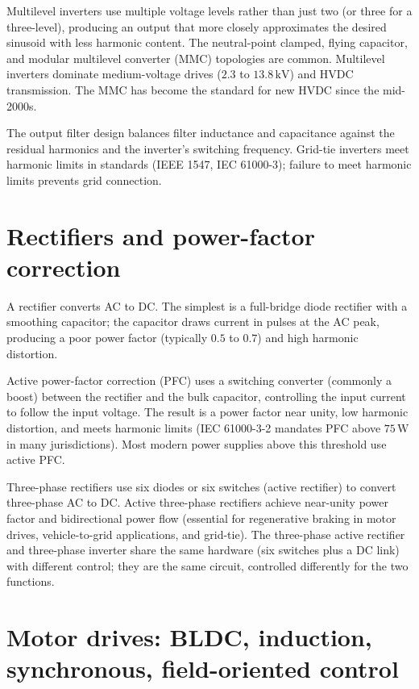 Multilevel inverters use multiple voltage levels rather than just two (or three for a three-level), producing an output that more closely approximates the desired sinusoid with less harmonic content. The neutral-point clamped, flying capacitor, and modular multilevel converter (MMC) topologies are common. Multilevel inverters dominate medium-voltage drives ($2.3$ to $13.8\,\text{kV}$) and HVDC transmission. The MMC has become the standard for new HVDC since the mid-2000s.

The output filter design balances filter inductance and capacitance against the residual harmonics and the inverter's switching frequency. Grid-tie inverters meet harmonic limits in standards (IEEE 1547, IEC 61000-3); failure to meet harmonic limits prevents grid connection.

\section{Rectifiers and power-factor correction}

A rectifier converts AC to DC. The simplest is a full-bridge diode rectifier with a smoothing capacitor; the capacitor draws current in pulses at the AC peak, producing a poor power factor (typically $0.5$ to $0.7$) and high harmonic distortion.

Active power-factor correction (PFC) uses a switching converter (commonly a boost) between the rectifier and the bulk capacitor, controlling the input current to follow the input voltage. The result is a power factor near unity, low harmonic distortion, and meets harmonic limits (IEC 61000-3-2 mandates PFC above $75\,\text{W}$ in many jurisdictions). Most modern power supplies above this threshold use active PFC.

Three-phase rectifiers use six diodes or six switches (active rectifier) to convert three-phase AC to DC. Active three-phase rectifiers achieve near-unity power factor and bidirectional power flow (essential for regenerative braking in motor drives, vehicle-to-grid applications, and grid-tie). The three-phase active rectifier and three-phase inverter share the same hardware (six switches plus a DC link) with different control; they are the same circuit, controlled differently for the two functions.

\section{Motor drives: BLDC, induction, synchronous, field-oriented control}


